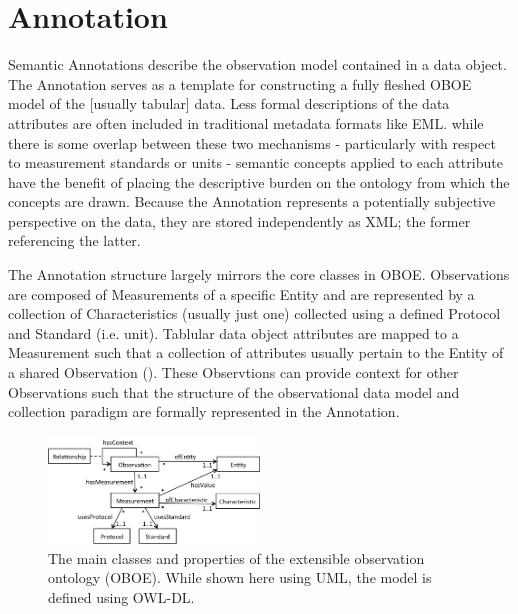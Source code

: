 
\section{Annotation}
\label{sec:annotation}

Semantic Annotations describe the observation model contained in a
data object. The Annotation serves as a template for constructing a
fully fleshed OBOE model of the [usually tabular] data. Less formal
descriptions of the data attributes are often included in traditional
metadata formats like EML. while there is some overlap between these
two mechanisms - particularly with respect to measurement standards or
units - semantic concepts applied to each attribute have the benefit
of placing the descriptive burden on the ontology from which the
concepts are drawn. Because the Annotation represents a potentially
subjective perspective on the data, they are stored independently as
XML; the former referencing the latter.

The Annotation structure largely mirrors the core classes in
OBOE. Observations are composed of Measurements of a specific Entity
and are represented by a collection of Characteristics (usually just
one) collected using a defined Protocol and Standard (i.e. unit).
Tablular data object attributes are mapped to a Measurement such that
a collection of attributes usually pertain to the Entity of a shared
Observation (). These Observtions can
provide context for other Observations such that the structure of the
observational data model and collection paradigm are formally
represented in the Annotation.

\begin{figure}
  \centering
  \includegraphics[width=0.5\textwidth]{images/oboe}
  \caption{The main classes and properties of the extensible
    observation ontology (OBOE). While shown here using UML, the model is
    defined using OWL-DL.}
  \label{fig:oboe}
\end{figure}


